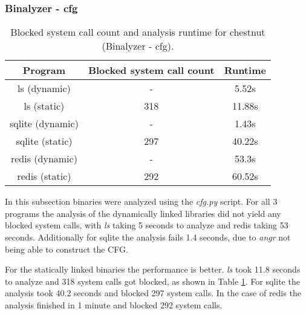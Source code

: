 \subsubsection {Binalyzer - cfg}
\begin{table}[!h]
\begin{center}
\caption{Blocked system call count and analysis runtime for chestnut (Binalyzer - cfg).}
\label{tbl:chestnut_bin_cfg_results}
\begin{tabular}{||c c c||} 
 \hline
 Program & Blocked system call count & Runtime \\
 \hline\hline
 ls (dynamic) & - & 5.52s \\ 
 \hline
 ls (static) & 318 & 11.88s \\ 
 \hline
 sqlite (dynamic) & - & 1.43s \\ 
 \hline
 sqlite (static) & 297 & 40.22s \\ 
 \hline
 redis (dynamic) & - & 53.3s \\ 
 \hline
 redis (static) & 292 & 60.52s \\ 
 \hline
\end{tabular}
\end{center}
\end{table}
In this subsection binaries were analyzed using the \textit{cfg.py} script.
For all 3 programs the analysis of the dynamically linked libraries did not yield any blocked system calls, with \textit{ls} taking 5 seconds to analyze and redis taking 53 seconds. Additionally for sqlite the analysis fails 1.4 seconds, due to \textit{angr} not being able to construct the CFG.

For the statically linked binaries the performance is better.
\textit{ls} took 11.8 seconds to analyze and 318 system calls got blocked, as shown in Table \ref{tbl:chestnut_bin_cfg_results}.
For sqlite the analysis took 40.2 seconds and blocked 297 system calls.
In the case of redis the analysis finished in 1 minute and blocked 292 system calls.

